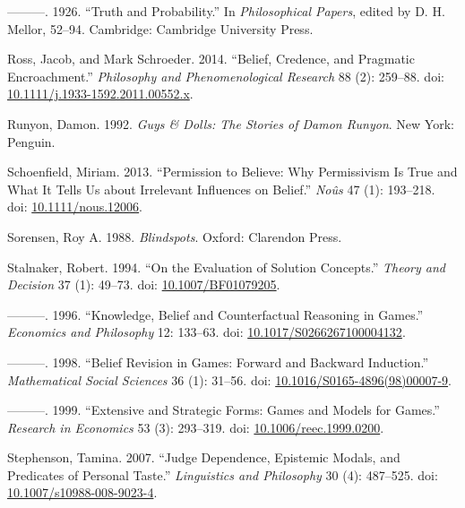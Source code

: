 \documentclass[
  10pt,
  letterpaper,
  DIV=11,
  numbers=noendperiod,
  twoside]{scrartcl}
\newlength{\cslhangindent}
\newenvironment{CSLReferences}[2] %
 {\begin{list}{}{%
  \setlength{\itemindent}{0pt}
  \setlength{\leftmargin}{0pt}
  \setlength{\parsep}{0pt}
  \ifodd #1
   \setlength{\leftmargin}{\cslhangindent}
   \setlength{\itemindent}{-1\cslhangindent}
  \fi
  \setlength{\itemsep}{#2\baselineskip}}}
 {\end{list}}
\begin{document}
\begin{CSLReferences}{1}{0}
---------. 1926. {``Truth and Probability.''} In \emph{Philosophical
Papers}, edited by D. H. Mellor, 52--94. Cambridge: Cambridge University
Press.

Ross, Jacob, and Mark Schroeder. 2014. {``Belief, Credence, and
Pragmatic Encroachment.''} \emph{Philosophy and Phenomenological
Research} 88 (2): 259--88. doi:
\href{https://doi.org/10.1111/j.1933-1592.2011.00552.x}{10.1111/j.1933-1592.2011.00552.x}.

Runyon, Damon. 1992. \emph{Guys \& Dolls: The Stories of {D}amon
{R}unyon}. New York: Penguin.

Schoenfield, Miriam. 2013. {``Permission to Believe: Why Permissivism Is
True and What It Tells Us about Irrelevant Influences on Belief.''}
\emph{No{û}s} 47 (1): 193--218. doi:
\href{https://doi.org/10.1111/nous.12006}{10.1111/nous.12006}.

Sorensen, Roy A. 1988. \emph{Blindspots}. Oxford: Clarendon Press.

Stalnaker, Robert. 1994. {``On the Evaluation of Solution Concepts.''}
\emph{Theory and Decision} 37 (1): 49--73. doi:
\href{https://doi.org/10.1007/BF01079205}{10.1007/BF01079205}.

---------. 1996. {``Knowledge, Belief and Counterfactual Reasoning in
Games.''} \emph{Economics and Philosophy} 12: 133--63. doi:
\href{https://doi.org/10.1017/S0266267100004132}{10.1017/S0266267100004132}.

---------. 1998. {``Belief Revision in Games: Forward and Backward
Induction.''} \emph{Mathematical Social Sciences} 36 (1): 31--56. doi:
\href{https://doi.org/10.1016/S0165-4896(98)00007-9}{10.1016/S0165-4896(98)00007-9}.

---------. 1999. {``Extensive and Strategic Forms: Games and Models for
Games.''} \emph{Research in Economics} 53 (3): 293--319. doi:
\href{https://doi.org/10.1006/reec.1999.0200}{10.1006/reec.1999.0200}.

Stephenson, Tamina. 2007. {``Judge Dependence, Epistemic Modals, and
Predicates of Personal Taste.''} \emph{Linguistics and Philosophy} 30
(4): 487--525. doi:
\href{https://doi.org/10.1007/s10988-008-9023-4}{10.1007/s10988-008-9023-4}.


\end{CSLReferences}
\end{document}
